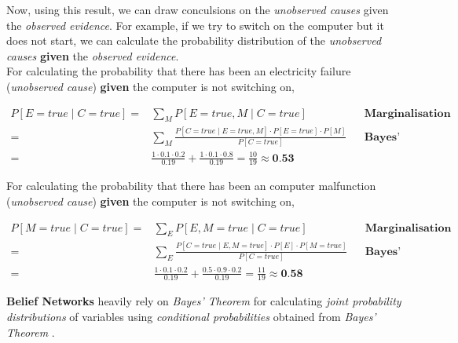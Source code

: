 Now, using this result, we can draw conculsions on the \emph{unobserved causes} given the \emph{observed evidence}. For example, if we try to switch on the computer but it does not start, we can calculate the probability distribution of the \emph{unobserved causes} \textbf{given} the \emph{observed evidence}.\\

For calculating the probability that there has been an electricity failure (\emph{unobserved cause}) \textbf{given} the computer is not switching on,

\begin{equation*}
\begin{aligned}
P[E = true \mid C = true] ={} & \sum_{M} P[E = true, M \mid C = true] && \textbf{Marginalisation}  \\
       								  ={} & \sum_{M} \frac{P[C = true \mid E = true, M] \cdot P[E = true] \cdot P[M]}{P[C = true]} && \textbf{Bayes' Theorem} \\
       								  ={} & \frac{1 \cdot 0.1 \cdot 0.2}{0.19} +\frac{1 \cdot 0.1 \cdot 0.8}{0.19} = \frac{10}{19} \approx \textbf{0.53}
\end{aligned}
\end{equation*}

For calculating the probability that there has been an computer malfunction (\emph{unobserved cause}) \textbf{given} the computer is not switching on,

\begin{equation*}
\begin{aligned}
P[M = true \mid C = true] ={} & \sum_{E} P[E, M = true \mid C = true] && \textbf{Marginalisation}  \\
                                           ={} & \sum_{E} \frac{P[C = true \mid E, M = true] \cdot P[E] \cdot P[M = true]}{P[C = true]}  && \textbf{Bayes' Theorem} \\
                                           ={} & \frac{1 \cdot 0.1 \cdot 0.2}{0.19} +\frac{0.5 \cdot 0.9 \cdot 0.2}{0.19} = \frac{11}{19} \approx \textbf{0.58}
\end{aligned}
\end{equation*}

\textbf{Belief Networks} heavily rely on \emph{Bayes' Theorem} for calculating \emph{joint probability distributions} of variables using \emph{conditional probabilities} obtained from \emph{Bayes' Theorem} .

